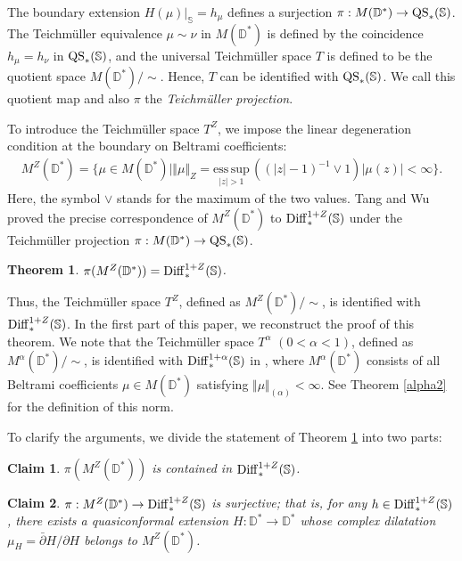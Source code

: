 \documentclass[amstex]{amsart}
\newtheorem{theorem}{Theorem}[section]
\newtheorem{claim}{Claim}
\theoremstyle{definition}
\theoremstyle{remark}
\numberwithin{equation}{section}
\begin{document}
The boundary extension $H(\mu)|_{\mathbb S}=h_\mu$ 
defines a surjection
$\pi:M(\mathbb D^*) \to {\rm QS}_*(\mathbb S)$. 
The Teichm\"uller equivalence $\mu \sim \nu$ in $M(\mathbb D^*)$ is defined by the coincidence
$h_\mu = h_\nu$ in ${\rm QS}_*(\mathbb S)$, and
the universal Teich\-m\"uller space $T$ is defined to be
the quotient space $M(\mathbb D^*)/\sim$. Hence, $T$ can be identified with ${\rm QS}_*(\mathbb S)$.
We call this quotient map and also $\pi$ the {\it Teichm\"uller projection}.


To introduce the Teichm\"uller space $T^Z$,
we impose the linear degeneration condition at the boundary on Beltrami coefficients:
\begin{align*}
M^Z(\mathbb D^*) = \{ \mu \in M(\mathbb D^*) \mid \Vert \mu \Vert_Z
= \underset{|z|>1}{\mathrm{ess\,sup}}\, ((|z|-1)^{-1} \lor 1) |\mu(z)| < \infty \}.
\end{align*}
Here, the symbol $\lor$ stands for the maximum of the two values. 
Tang and Wu \cite[Theorem 1.1]{TW1} proved 
the precise correspondence of $M^Z(\mathbb D^*)$ to ${\rm Diff}^{1+Z}_*(\mathbb S)$
under the Teichm\"uller projection $\pi:M(\mathbb D^*) \to {\rm QS}_*(\mathbb S)$.

\begin{theorem}\label{basic}
$\pi(M^Z(\mathbb D^*)) = {\rm Diff}^{1+Z}_*(\mathbb S)$. 
\end{theorem}

Thus, the Teichm\"uller space $T^Z$, defined as $M^Z(\mathbb D^*)/\sim$, is 
identified with ${\rm Diff}^{1+Z}_*(\mathbb S)$.
In the first part of this paper, we reconstruct the proof of this theorem.
We note that the Teichm\"uller space $T^\alpha$ $(0<\alpha <1)$, defined as $M^\alpha(\mathbb D^*)/\sim$, is 
identified with ${\rm Diff}^{1+\alpha}_*(\mathbb S)$ in \cite{M0}, where 
$M^\alpha(\mathbb D^*)$ consists of all Beltrami coefficients $\mu \in M(\mathbb D^*)$
satisfying $\Vert \mu \Vert_{(\alpha)}<\infty$. See Theorem \ref{alpha2} for the definition of this norm.

To clarify the arguments, we divide the statement of Theorem \ref{basic} into two parts:

\begin{claim}\label{claim1}
$\pi(M^Z(\mathbb D^*))$ is contained in ${\rm Diff}^{1+Z}_*(\mathbb S)$.
\end{claim}

\begin{claim}\label{claim2}
$\pi:M^Z(\mathbb D^*) \to {\rm Diff}^{1+Z}_*(\mathbb S)$ is surjective; that is, for any $h \in {\rm Diff}^{1+Z}_*(\mathbb S)$, there exists a quasiconformal extension $H:\mathbb D^* \to \mathbb D^*$ whose
complex dilatation $\mu_H=\bar \partial H/\partial H$ belongs to $M^Z(\mathbb D^*)$.
\end{claim}
\end{document}

